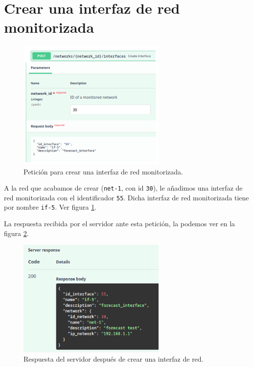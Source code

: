 \documentclass[a4paper, oneside, 12pt]{book}
\begin{document}
	\section{Crear una interfaz de red monitorizada}
	
	\begin{figure}[h!]
		\begin{center}
			\includegraphics[width=0.65\textwidth]{diag/request_create_if.png}
			\caption{Petición para crear una interfaz de red monitorizada.}
			\label{img: request create if (validate)}
		\end{center}
	\end{figure}

	\pagebreak
	
	\noindent A la red que acabamos de crear (\texttt{net-1}, con id \texttt{30}), le añadimos una interfaz de red monitorizada con el identificador \texttt{55}. Dicha interfaz de red monitorizada tiene por nombre \texttt{if-5}. Ver figura \ref{img: request create if (validate)}.
	
	\noindent La respuesta recibida por el servidor ante esta petición, la podemos ver en la figura \ref{img: response create if (validate)}.
	
	\begin{figure}[h!]
		\begin{center}
			\includegraphics[width=0.65\textwidth]{img/response_create_if.png}
			\caption{Respuesta del servidor después de crear una interfaz de red.}
			\label{img: response create if (validate)}
		\end{center}
	\end{figure}
	
\end{document}
